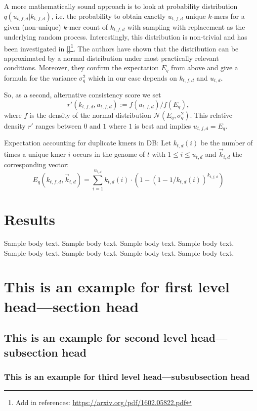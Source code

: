 \documentclass[
	a4paper, %
	10pt, %
	unnumberedsections, %
	twoside, %
]{LTJournalArticle}
\begin{document}
A more mathematically sound approach is to look at probability distribution $q(u_{t,f,d}|k_{t,f,d})$, i.e. the probability to obtain exactly $u_{t,f,d}$ unique $k$-mers for a given (non-unique) $k$-mer count of $k_{t,f,d}$ with  sampling with replacement as the underlying random process.
Interestingly, this distribution is non-trivial and has been investigated in \ref{}\footnote{Add in references: \url{https://arxiv.org/pdf/1602.05822.pdf}}. The authors have shown that the distribution can be approximated by a normal distribution under most practically relevant conditions. Moreover, they confirm the expectation $E_q$ from above and give a formula for the variance $\sigma^2_q$ which in our case depends on $k_{t,f,d}$ and $u_{t,d}$.

So, as a second, alternative consistency score we set
\[ r'(k_{t,f,d}, u_{t,f,d}) := f(u_{t,f,d}) / f(E_q),\]
where $f$ is the density of the normal distribution $\mathcal{N}(E_q,\sigma^2_q)$.
This relative density $r'$ ranges between $0$ and $1$ where $1$ is best and implies $u_{t,f,d} = E_q$.

Expectation accounting for duplicate kmers in DB:
Let $k_{t,d}(i)$ be the number of times a unique kmer $i$ occurs in the genome of $t$ with $1 \leq i \leq u_{t,d}$ and $\vec{k}_{t,d}$ the corresponding vector:
\[ E_q(k_{t,f,d},\vec{k}_{t,d}) = \sum_{i = 1}^{u_{t,d}} k_{t,d}(i) \cdot (1 - (1 - 1/k_{t,d}(i))^{k_{t,f,d}}) \]

\section{Results}\label{sec2}

Sample body text. Sample body text. Sample body text. Sample body text. Sample body text. Sample body text. Sample body text. Sample body text.

\section{This is an example for first level head---section head}\label{sec3}

\subsection{This is an example for second level head---subsection head}\label{subsec2}

\subsubsection{This is an example for third level head---subsubsection head}\label{subsubsec2}
\end{document}
